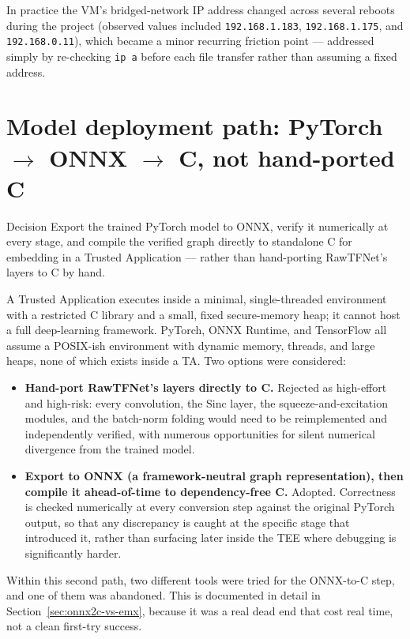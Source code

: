 \documentclass[11pt,a4paper]{report}
\newcommand{\code}[1]{\texttt{\small #1}}
\begin{document}
In practice the VM's bridged-network IP address changed across several reboots during the project
(observed values included \code{192.168.1.183}, \code{192.168.1.175}, and \code{192.168.0.11}),
which became a minor recurring friction point --- addressed simply by re-checking \code{ip a} before
each file transfer rather than assuming a fixed address.

\section{Model deployment path: PyTorch $\rightarrow$ ONNX $\rightarrow$ C, not hand-ported C}
\label{sec:onnx-path}

\begin{decisionbox}{Decision}
Export the trained PyTorch model to ONNX, verify it numerically at every stage, and compile the
verified graph directly to standalone C for embedding in a Trusted Application --- rather than
hand-porting RawTFNet's layers to C by hand.
\end{decisionbox}

A Trusted Application executes inside a minimal, single-threaded environment with a restricted C
library and a small, fixed secure-memory heap; it cannot host a full deep-learning framework.
PyTorch, ONNX Runtime, and TensorFlow all assume a POSIX-ish environment with dynamic memory,
threads, and large heaps, none of which exists inside a TA. Two options were considered:

\begin{itemize}[leftmargin=1.4em]
  \item \textbf{Hand-port RawTFNet's layers directly to C.} Rejected as high-effort and high-risk:
  every convolution, the Sinc layer, the squeeze-and-excitation modules, and the batch-norm folding
  would need to be reimplemented and independently verified, with numerous opportunities for silent
  numerical divergence from the trained model.
  \item \textbf{Export to ONNX (a framework-neutral graph representation), then compile it
  ahead-of-time to dependency-free C.} Adopted. Correctness is checked numerically at every
  conversion step against the original PyTorch output, so that any discrepancy is caught at the
  specific stage that introduced it, rather than surfacing later inside the TEE where debugging is
  significantly harder.
\end{itemize}

Within this second path, two different tools were tried for the ONNX-to-C step, and one of them was
abandoned. This is documented in detail in Section~\ref{sec:onnx2c-vs-emx}, because it was a real
dead end that cost real time, not a clean first-try success.
\end{document}
